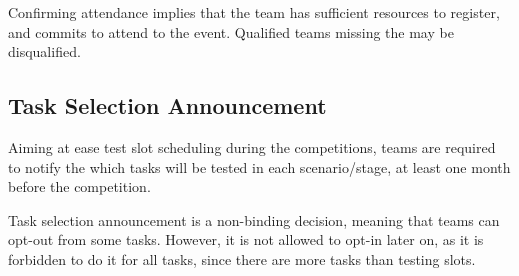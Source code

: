 Confirming attendance implies that the team has sufficient resources to register, and commits to attend to the event.
Qualified teams missing the  may be disqualified.

\subsection{Task Selection Announcement}
\label{rule:task-selection-announcement}
Aiming at ease test slot scheduling during the competitions, teams are required to notify the  which tasks will be tested in each scenario/stage, at least one month before the competition.

Task selection announcement is a non-binding decision, meaning that teams can opt-out from some tasks. However, it is not allowed to opt-in later on, as it is forbidden to do it for all tasks, since there are more tasks than testing slots.

